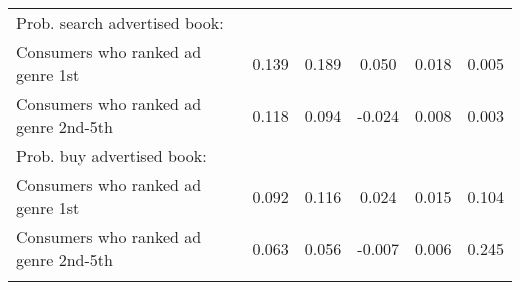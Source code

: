 \begin{center}
\begin{tabular}{lccccc}
\hspace{5pt} Prob. search advertised book: &  &  &  &  & \\
\hspace{5pt} Consumers who ranked ad genre 1st & 0.139 & 0.189 & 0.050 & 0.018 & 0.005\\
\hspace{5pt} Consumers who ranked ad genre 2nd-5th & 0.118 & 0.094 & -0.024 & 0.008 & 0.003\\
\hspace{5pt} Prob. buy advertised book: &  &  &  &  & \\
\hspace{5pt} Consumers who ranked ad genre 1st & 0.092 & 0.116 & 0.024 & 0.015 & 0.104\\
\hspace{5pt} Consumers who ranked ad genre 2nd-5th & 0.063 & 0.056 & -0.007 & 0.006 & 0.245\\
\noalign{\smallskip}\hline\end{tabular}\\
\end{center}
